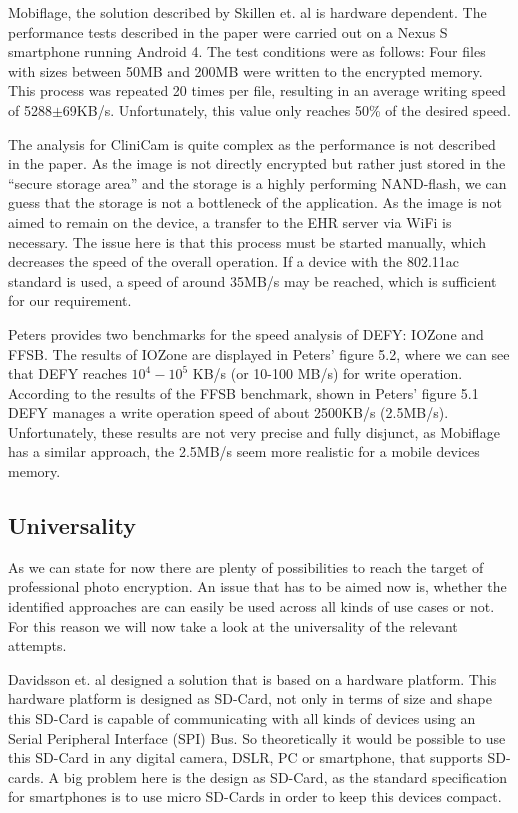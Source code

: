 \documentclass[12pt,a4paper,titlepage,oneside]{scrartcl}
\begin{document}
Mobiflage, the solution described by Skillen et. al \cite{skillen2013implementing} is hardware dependent.
The performance tests described in the paper were carried out on a Nexus S smartphone running Android 4.
The test conditions were as follows: 
Four files with sizes between 50MB and 200MB were written to the encrypted memory.
This process was repeated 20 times per file, resulting in an average writing speed of 5288$\pm$69KB/s.
Unfortunately, this value only reaches 50\% of the desired speed.

The analysis for CliniCam \cite{pmid25565678} is quite complex as the performance is not described in the paper.
As the image is not directly encrypted but rather just stored in the ``secure storage area'' and the storage is a highly performing NAND-flash, we can guess that the storage is not a bottleneck of the application.
As the image is not aimed to remain on the device, a transfer to the EHR server via WiFi is necessary.
The issue here is that this process must be started manually, which decreases the speed of the overall operation.
If a device with the 802.11ac standard is used, a speed of around 35MB/s may be reached, which is sufficient for our requirement.

Peters\cite{peters2015defy} provides two benchmarks for the speed analysis of DEFY: IOZone and FFSB.
The results of IOZone are displayed in Peters' figure 5.2, where we can see that DEFY reaches \begin{math} 10^{4}-10^{5}\end{math} KB/s (or 10-100 MB/s) for write operation.
According to the results of the FFSB benchmark, shown in Peters' figure 5.1 DEFY manages a write operation speed of about 2500KB/s (2.5MB/s).
Unfortunately, these results are not very precise and fully disjunct, as Mobiflage has a similar approach, the 2.5MB/s seem more realistic for a mobile devices memory.

\subsection{Universality}
As we can state for now there are plenty of possibilities to reach the target of professional photo encryption.
An issue that has to be aimed now is, whether the identified approaches are can easily be used across all kinds of use cases or not.
For this reason we will now take a look at the universality of the relevant attempts.

Davidsson et. al \cite{Davidsson2016} designed a solution that is based on a hardware platform.
This hardware platform is designed as SD-Card, not only in terms of size and shape this SD-Card is capable of communicating with all kinds of devices using an Serial Peripheral Interface (SPI) Bus.
So theoretically it would be possible to use this SD-Card in any digital camera, DSLR, PC or smartphone, that supports SD-cards.
A big problem here is the design as SD-Card, as the standard specification for smartphones is to use micro SD-Cards in order to keep this devices compact.
\end{document}
